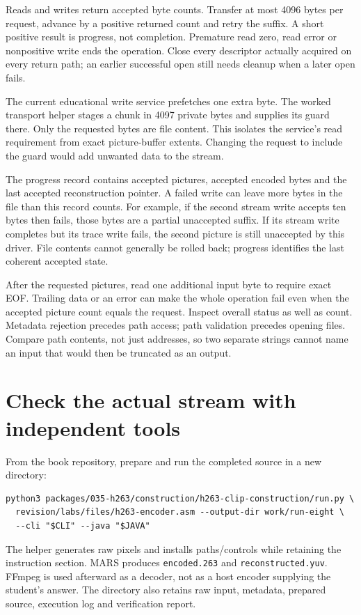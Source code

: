 

Reads and writes return accepted byte counts. Transfer at most 4096 bytes per
request, advance by a positive returned count and retry the suffix. A short
positive result is progress, not completion. Premature read zero, read error or
nonpositive write ends the operation. Close every descriptor actually acquired
on every return path; an earlier successful open still needs cleanup when a
later open fails.

The current educational write service prefetches one extra byte. The worked
transport helper stages a chunk in 4097 private bytes and supplies its guard
there. Only the requested bytes are file content. This isolates the service's
read requirement from exact picture-buffer extents. Changing the request to
include the guard would add unwanted data to the stream.

The progress record contains accepted pictures, accepted encoded bytes and the
last accepted reconstruction pointer. A failed write can leave more bytes in the
file than this record counts. For example, if the second stream write accepts
ten bytes then fails, those bytes are a partial unaccepted suffix. If its stream
write completes but its trace write fails, the second picture is still unaccepted
by this driver. File contents cannot generally be rolled back; progress identifies
the last coherent accepted state.

After the requested pictures, read one additional input byte to require exact EOF.
Trailing data or an error can make the whole operation fail even when the accepted
picture count equals the request. Inspect overall status as well as count.
Metadata rejection precedes path access; path validation precedes opening files.
Compare path contents, not just addresses, so two separate strings cannot name
an input that would then be truncated as an output.



\section{Check the actual stream with independent tools}

From the book repository, prepare and run the completed source in a new directory:
\begin{Verbatim}
python3 packages/035-h263/construction/h263-clip-construction/run.py \
  revision/labs/files/h263-encoder.asm --output-dir work/run-eight \
  --cli "$CLI" --java "$JAVA"
\end{Verbatim}
The helper generates raw pixels and installs paths/controls while retaining the
instruction section. MARS produces \texttt{encoded.263} and
\texttt{reconstructed.yuv}. FFmpeg is used afterward as a decoder, not as a
host encoder supplying the student's answer. The directory also retains raw
input, metadata, prepared source, execution log and verification report.

